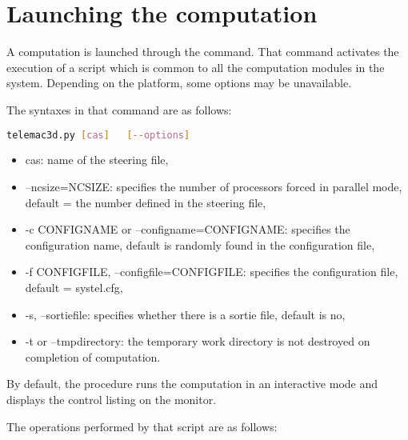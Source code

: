 \chapter{Launching the computation}

A computation is launched through the  command. That command
activates the execution of a script which is common to all the computation
modules in the \tel system. Depending on the platform, some options may be
unavailable.

The syntaxes in that command are as follows:

\begin{lstlisting}[language=bash]
telemac3d.py [cas]   [--options]
\end{lstlisting}

\begin{itemize}
\item cas: name of the steering file,

\item --ncsize=NCSIZE: specifies the number of processors forced in parallel
mode, default = the number defined in the steering file,

\item -c CONFIGNAME or --configname=CONFIGNAME: specifies the configuration
name, default is randomly found in the configuration file,

\item -f CONFIGFILE, --configfile=CONFIGFILE: specifies the configuration
file, default = systel.cfg,

\item -s, --sortiefile: specifies whether there is a sortie file, default is
no,

\item -t or --tmpdirectory: the temporary work directory is not destroyed on
completion of computation.
\end{itemize}

By default, the procedure runs the computation in an interactive mode and
displays the control listing on the monitor.

The operations performed by that script are as follows:

